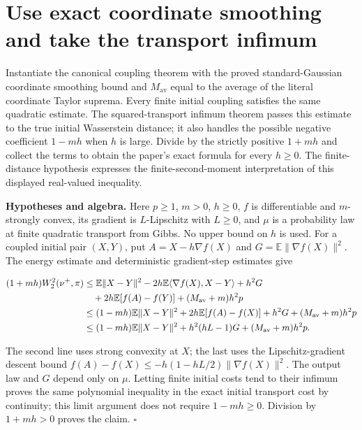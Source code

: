 \documentclass[11pt,a4paper]{article}
\begin{document}
\section{\texorpdfstring{Use exact coordinate smoothing and take the transport infimum}{Use exact coordinate smoothing and take the transport infimum}}


Instantiate the canonical coupling theorem with the proved standard-Gaussian coordinate smoothing bound and \(M_{\mathrm{av}}\) equal to the average of the literal coordinate Taylor suprema. Every finite initial coupling satisfies the same quadratic estimate. The squared-transport infimum theorem passes this estimate to the true initial Wasserstein distance; it also handles the possible negative coefficient \(1-mh\) when \(h\) is large. Divide by the strictly positive \(1+mh\) and collect the terms to obtain the paper’s exact formula for every \(h\ge 0\). The finite-distance hypothesis expresses the finite-second-moment interpretation of this displayed real-valued inequality.




\textbf{Hypotheses and algebra.} Here \(p\ge1\), \(m>0\), \(h\ge0\), \(f\) is differentiable and \(m\)-strongly convex, its gradient is \(L\)-Lipschitz with \(L\ge0\), and \(\mu\) is a probability law at finite quadratic transport from Gibbs. No upper bound on \(h\) is used. For a coupled initial pair \((X,Y)\), put \(A=X-h\nabla f(X)\) and \(G=\mathbb E\|\nabla f(X)\|^2\). The energy estimate and deterministic gradient-step estimates give

\[\begin{aligned}(1+mh)W_2^2(\nu^+,\pi)&\le\mathbb E\|X-Y\|^2-2h\mathbb E\langle\nabla f(X),X-Y\rangle+h^2G\\&\quad+2h\mathbb E[f(A)-f(Y)]+(M_{\rm av}+m)h^2p\\&\le(1-mh)\mathbb E\|X-Y\|^2+2h\mathbb E[f(A)-f(X)]+h^2G+(M_{\rm av}+m)h^2p\\&\le(1-mh)\mathbb E\|X-Y\|^2+h^2(hL-1)G+(M_{\rm av}+m)h^2p.\end{aligned}\]

The second line uses strong convexity at \(X\); the last uses the Lipschitz-gradient descent bound \(f(A)-f(X)\le-h(1-hL/2)\|\nabla f(X)\|^2\). The output law and \(G\) depend only on \(\mu\). Letting finite initial costs tend to their infimum proves the same polynomial inequality in the exact initial transport cost by continuity; this limit argument does not require \(1-mh\ge0\). Division by \(1+mh>0\) proves the claim. \(\square\)
\end{document}
